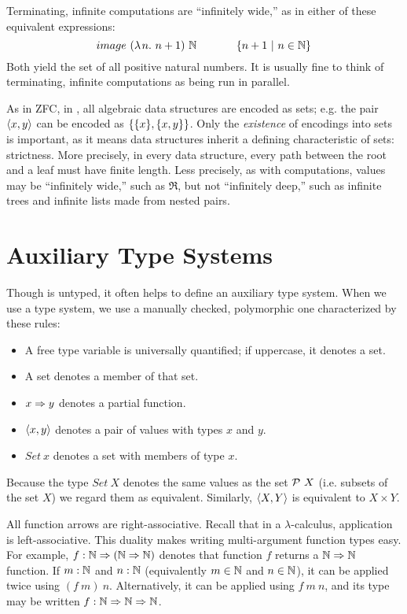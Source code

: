 Terminating, infinite computations are ``infinitely wide,'' as in either of these equivalent expressions:
\begin{equation}
	image~(\lambda\mspace{2mu}{n}\ldotp\, n+1)~\mathbb{N} \hspace{0.5in} \lbrace {n+1} \ \lvert\ {n \in \mathbb{N}} \rbrace
\end{equation}
Both yield the set of all positive natural numbers.
It is usually fine to think of terminating, infinite computations as being run in parallel.

As in ZFC, in \lzfclang, all algebraic data structures are encoded as sets; e.g. the pair $\langle{x,y}\rangle$ can be encoded as $\{{\{{x}\},\{{x,y}\}}\}$.
Only the \emph{existence} of encodings into sets is important, as it means data structures inherit a defining characteristic of sets: strictness.
More precisely, in every data structure, every path between the root and a leaf must have finite length.
Less precisely, as with computations, values may be ``infinitely wide,'' such as $\Re$, but not ``infinitely deep,'' such as infinite trees and infinite lists made from nested pairs.

\section{Auxiliary Type Systems}

Though \lzfclang is untyped, it often helps to define an auxiliary type system.
When we use a type system, we use a manually checked, polymorphic one characterized by these rules:
\begin{itemize}
	\item A free type variable is universally quantified; if uppercase, it denotes a set.
	\item A set denotes a member of that set.
	\item $x \Rightarrow y$ denotes a partial function.
	\item $\langle{x,y}\rangle$ denotes a pair of values with types $x$ and $y$.
	\item $Set~x$ denotes a set with members of type $x$.
\end{itemize}
Because the type $Set~X$ denotes the same values as the set $\mathcal{P}~X$ (i.e. subsets of the set $X$) we regard them as equivalent.
Similarly, $\langle{X,Y}\rangle$ is equivalent to $X \times Y$.

All function arrows are right-associative.
Recall that in a $\lambda$-calculus, application is left-associative.
This duality makes writing multi-argument function types easy.
For example, $f : \mathbb{N} \Rightarrow (\mathbb{N} \Rightarrow \mathbb{N})$ denotes that function $f$ returns a $\mathbb{N} \Rightarrow \mathbb{N}$ function.
If $m : \mathbb{N}$ and $n : \mathbb{N}$ (equivalently $m \in \mathbb{N}$ and $n \in \mathbb{N}$), it can be applied twice using $(f~m)~n$.
Alternatively, it can be applied using $f~m~n$, and its type may be written $f : \mathbb{N} \Rightarrow \mathbb{N} \Rightarrow \mathbb{N}$.

